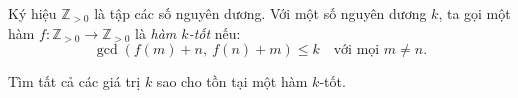 \ifshowproblem
\begin{problem}\label{example:IMO-2015-SL-P7}
    Ký hiệu \( \mathbb{Z}_{>0} \) là tập các số nguyên dương.
    Với một số nguyên dương \( k \), ta gọi một hàm \( f: \mathbb{Z}_{>0} \to \mathbb{Z}_{>0} \) là \textit{hàm \( k \)-tốt} nếu:
    \[
        \gcd(f(m) + n,\ f(n) + m) \le k \quad \text{với mọi } m \ne n.
    \]
    
    Tìm tất cả các giá trị \( k \) sao cho tồn tại một hàm \( k \)-tốt.    
\end{problem}
\fi

\footnotemark
{}
\fi